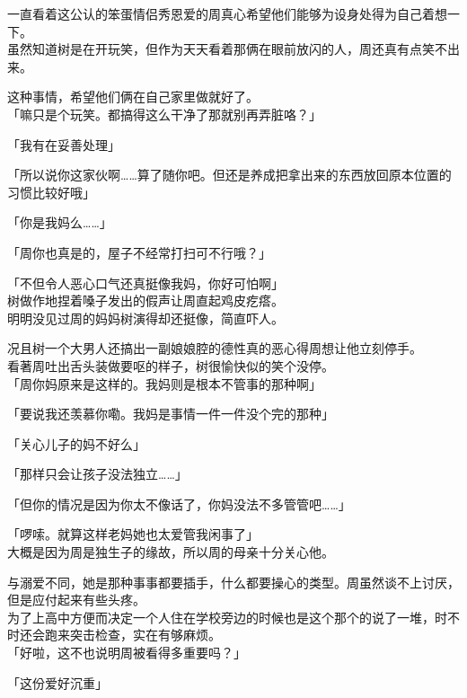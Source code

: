 一直看着这公认的笨蛋情侣秀恩爱的周真心希望他们能够为设身处得为自己着想一下。\\

虽然知道树是在开玩笑，但作为天天看着那俩在眼前放闪的人，周还真有点笑不出来。

这种事情，希望他们俩在自己家里做就好了。\\

「嘛只是个玩笑。都搞得这么干净了那就别再弄脏咯？」%

「我有在妥善处理」

「所以说你这家伙啊……算了随你吧。但还是养成把拿出来的东西放回原本位置的习惯比较好哦」

「你是我妈么……」

「周你也真是的，屋子不经常打扫可不行哦？」

「不但令人恶心口气还真挺像我妈，你好可怕啊」\\

树做作地捏着嗓子发出的假声让周直起鸡皮疙瘩。\\

明明没见过周的妈妈树演得却还挺像，简直吓人。

况且树一个大男人还搞出一副娘娘腔的德性真的恶心得周想让他立刻停手。\\

看著周吐出舌头装做要呕的样子，树很愉快似的笑个没停。\\

「周你妈原来是这样的。我妈则是根本不管事的那种啊」

「要说我还羡慕你嘞。我妈是事情一件一件没个完的那种」

「关心儿子的妈不好么」

「那样只会让孩子没法独立……」

「但你的情况是因为你太不像话了，你妈没法不多管管吧……」

「啰嗦。就算这样老妈她也太爱管我闲事了」\\

大概是因为周是独生子的缘故，所以周的母亲十分关心他。

与溺爱不同，她是那种事事都要插手，什么都要操心的类型。周虽然谈不上讨厌，但是应付起来有些头疼。\\

为了上高中方便而决定一个人住在学校旁边的时候也是这个那个的说了一堆，时不时还会跑来突击检查，实在有够麻烦。\\

「好啦，这不也说明周被看得多重要吗？」

「这份爱好沉重」


